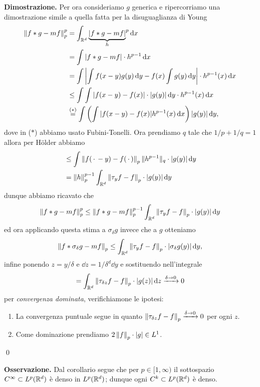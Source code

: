 \textbf{Dimostrazione.}
Per ora consideriamo $g$ generica e ripercorriamo una dimostrazione simile a quella fatta per la disuguaglianza di Young
$$
\begin{aligned}
	\left\lVert f \ast g - m f \right\rVert_p^p 
	&= \int_{\mathbb R^d} {\underbrace{|f \ast g - m f|}_h}^p \,\mathrm{d} x \\
	&= \int |f \ast g - m f| \cdot h^{p-1} \,\mathrm{d} x \\
	&= \int \left| \int f(x - y) g(y) \,\mathrm{d} y - f(x) \int g(y) \,\mathrm{d} y \right| \cdot h^{p-1}(x) \,\mathrm{d} x \\
	&\leq \int \int |f(x - y) - f(x)| \cdot |g(y)| \,\mathrm{d} y \cdot h^{p-1}(x) \,\mathrm{d} x \\
	&\overset{\text{($*$)}}{=} \int \left(\int |f(x - y) - f(x)| h^{p-1}(x) \,\mathrm{d} x \right) |g(y)| \,\mathrm{d} y,
\end{aligned}
$$
dove in ($*$) abbiamo usato Fubini-Tonelli. Ora prendiamo $q$ tale che $1/p + 1/q = 1$ allora per H\"older abbiamo
$$
\begin{aligned}
	&\leq \int \left\lVert f(\,\cdot\, - y) - f(\,\cdot\,) \right\rVert_p \| h^{p-1} \|_q \cdot |g(y)| \,\mathrm{d} y \\
	&= \left\lVert h \right\rVert_p^{p-1} \int_{\mathbb R^d} \left\lVert \tau_y f - f \right\rVert_p \cdot |g(y)| \,\mathrm{d} y \\
\end{aligned}
$$
dunque abbiamo ricavato che
$$
\left\lVert f \ast g - m f \right\rVert_p^p 
\leq \left\lVert f \ast g - m f \right\rVert_p^{p-1} \int_{\mathbb R^d} \left\lVert \tau_y f - f \right\rVert_p \cdot |g(y)| \,\mathrm{d} y
$$
ed ora applicando questa stima a $\sigma_\delta g$ invece che a $g$ otteniamo
$$
\left\lVert f \ast \sigma_\delta g - m f \right\rVert_p
\leq \int_{\mathbb R^d} \left\lVert \tau_y f - f \right\rVert_p \cdot |\sigma_\delta g(y)| \,\mathrm{d} y,
$$
infine ponendo $z = y / \delta$ e $\dd z = 1/\delta^d \dd y$ e sostituendo nell'integrale
$$
= \int_{\mathbb R^d} \left\lVert \tau_{\delta z} f - f \right\rVert_p \cdot |g(z)| \,\mathrm{d} z \xrightarrow{\delta \to 0} 0
$$
per \textit{convergenza dominata}, verifichiamone le ipotesi:
\begin{enumerate}
	\item La convergenza puntuale segue in quanto $\left\lVert \tau_{\delta z} f - f \right\rVert_p \xrightarrow{\delta \to 0} 0$ per ogni $z$.
	\item Come dominazione prendiamo $2 \left\lVert f \right\rVert_p \cdot |g| \in L^1$.
\end{enumerate}
\qed

\vss


\textbf{Osservazione.} Dal corollario segue che per $p \in [1,\infty)$ il sottospazio $C^\infty \subset L^p(\mathbb R^d)$ è denso in $L^p(\mathbb R^d)$; dunque ogni $C^k \subset L^p(\mathbb R^d)$ è denso.
